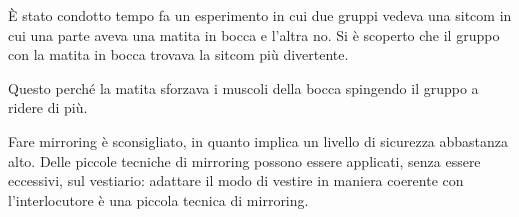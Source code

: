 \begin{example}
È stato condotto tempo fa un esperimento in cui due gruppi vedeva una sitcom
in cui una parte aveva una matita in bocca e l'altra no. Si è scoperto che il
gruppo con la matita in bocca trovava la sitcom più divertente.

\noindent Questo perché la matita sforzava i muscoli della bocca spingendo il
gruppo a ridere di più.
\end{example}

 Fare mirroring è
sconsigliato, in quanto implica un livello di sicurezza abbastanza alto. Delle
piccole tecniche di mirroring possono essere applicati, senza essere eccessivi,
sul vestiario: adattare il modo di vestire in maniera coerente con
l'interlocutore è una piccola tecnica di mirroring.
